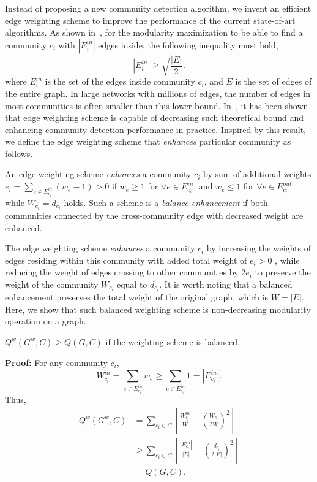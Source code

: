 Instead of proposing a new community detection algorithm, we invent an efficient edge weighting scheme to improve the performance of the current state-of-art algorithms. As shown in~\cite{fortunato2007resolution}, for the modularity maximization to be able to find a community $c_i$ with $|E^{in}_i|$ edges inside, the following inequality must hold,
\begin{equation}
|E^{in}_i| \geq \sqrt{\frac{|E|}{2}}.
\end{equation}
where $E^{in}_i$ is the set of the edges inside community $c_i$, and $E$ is the set of edges of the entire graph. In large networks with millions of edges, the number of edges in most communities is often smaller than this lower bound. In~\cite{berry2011tolerating}, it has been shown that edge weighting scheme is capable of decreasing such theoretical bound and enhancing community detection performance in practice. Inspired by this result, we define the edge weighting scheme that \textit{enhances} particular community as follows.
\begin{rmk} An edge weighting scheme \textit{enhances} a community $c_i$ by sum of additional weights $e_i=\sum_{e\in {E^{in}_{c_i}}} (w_e - 1)>0$ if $w_e \geq 1$ for $\forall e \in E^{in}_{c_i}$,  and $w_e \leq 1 $ for $\forall e \in E^{out}_{c_i}$ while $W_{c_i} = d_{c_i}$ holds. Such a scheme is a {\it balance enhancement} if both communities connected by the cross-community edge with decreased weight are enhanced. \end{rmk}
The edge weighting scheme \textit{enhances} a community $c_i$ by increasing the weights of edges residing within this community with added total weight of $e_i>0$ , while reducing the weight of edges crossing to other communities by $2e_i$ to preserve the weight of the community $W_{c_i}$ equal to $d_{c_i}$. It is worth noting that a balanced enhancement preserves the total weight of the original graph, which is $W = |E|$. Here, we show that such balanced weighting scheme is non-decreasing modularity operation on a graph.
\begin{thm}  \label{theorem:1} $Q^w(G^w, C) \geq Q(G, C)$ if the weighting scheme is balanced. \end{thm}
\noindent \textbf{Proof:} 
For any community $c_i$, 
\begin{equation}
W^{in}_{c_i} = \sum_{e\in E^{in}_{c_i} } w_e \geq \sum_{e\in E^{in}_{c_i} } 1 = |E_{c_i}^{in}|.
\end{equation}
Thus,
\begin{align}
    Q^{w}(G^w, C) & = \sum_{c_i \in C} \left[ \frac{W_{c_i}^{in} }{ W } - \left( \frac{W_{c_i}}{ 2 W}\right)^2 \right]\\
    & \geq \sum_{c_i \in C} \left[ \frac{|E_{c_i}^{in}| }{ |E| } - \left( \frac{d_{c_i}}{ 2 |E|}\right)^2 \right]\\
    & = Q(G, C).
\end{align}

